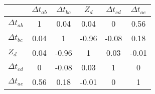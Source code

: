 \begin{tabular}{|l|c|c|c|c|c|}
\hline
&\textbf{$\Delta{t}_{ab}$}&\textbf{$\Delta{t}_{bc}$}&\textbf{$Z_d$}&\textbf{$\Delta{t}_{cd}$}&\textbf{$\Delta{t}_{ae}$}\\\hline
\textbf{$\Delta{t}_{ab}$}&1&0.04&0.04&0&0.56\\\hline
\textbf{$\Delta{t}_{bc}$}&0.04&1&-0.96&-0.08&0.18\\\hline
\textbf{$Z_d$}&0.04&-0.96&1&0.03&-0.01\\\hline
\textbf{$\Delta{t}_{cd}$}&0&-0.08&0.03&1&0\\\hline
\textbf{$\Delta{t}_{ae}$}&0.56&0.18&-0.01&0&1\\\hline
\end{tabular}
